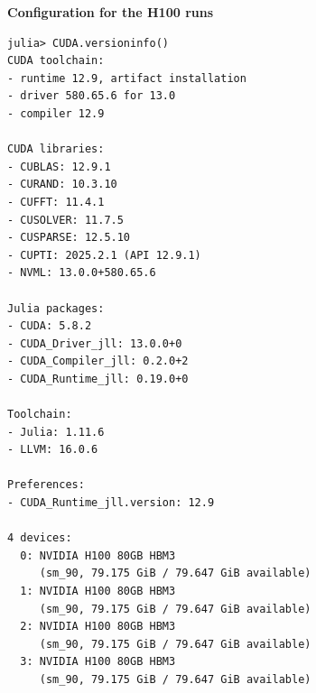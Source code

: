 \noindent \textbf{Configuration for the H100 runs}

{\small \begin{verbatim}
julia> CUDA.versioninfo()
CUDA toolchain: 
- runtime 12.9, artifact installation
- driver 580.65.6 for 13.0
- compiler 12.9

CUDA libraries: 
- CUBLAS: 12.9.1
- CURAND: 10.3.10
- CUFFT: 11.4.1
- CUSOLVER: 11.7.5
- CUSPARSE: 12.5.10
- CUPTI: 2025.2.1 (API 12.9.1)
- NVML: 13.0.0+580.65.6

Julia packages: 
- CUDA: 5.8.2
- CUDA_Driver_jll: 13.0.0+0
- CUDA_Compiler_jll: 0.2.0+2
- CUDA_Runtime_jll: 0.19.0+0

Toolchain:
- Julia: 1.11.6
- LLVM: 16.0.6

Preferences:
- CUDA_Runtime_jll.version: 12.9

4 devices:
  0: NVIDIA H100 80GB HBM3
     (sm_90, 79.175 GiB / 79.647 GiB available)
  1: NVIDIA H100 80GB HBM3
     (sm_90, 79.175 GiB / 79.647 GiB available)
  2: NVIDIA H100 80GB HBM3
     (sm_90, 79.175 GiB / 79.647 GiB available)
  3: NVIDIA H100 80GB HBM3
     (sm_90, 79.175 GiB / 79.647 GiB available)
\end{verbatim}}



